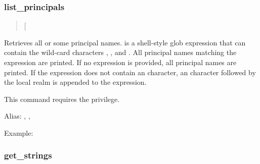 \documentclass[letterpaper,10pt,english]{sphinxmanual}
\begin{document}
\subsubsection{list\_principals}
\label{\detokenize{admin/admin_commands/kadmin_local:get-principal-end}}\label{\detokenize{admin/admin_commands/kadmin_local:id8}}\label{\detokenize{admin/admin_commands/kadmin_local:list-principals}}\begin{quote}

 {[}\sphinxstyleemphasis{expression}{]}
\end{quote}

Retrieves all or some principal names.   is a shell-style
glob expression that can contain the wild-card characters ,
\sphinxcode{*}, and \sphinxcode{{[}{]}}.  All principal names matching the expression are
printed.  If no expression is provided, all principal names are
printed.  If the expression does not contain an  character, an
 character followed by the local realm is appended to the
expression.

This command requires the  privilege.

Alias: , , 

Example:

%
\begin{sphinxVerbatim}[commandchars=\\\{\}]
   
\end{sphinxVerbatim}
\label{\detokenize{admin/admin_commands/kadmin_local:list-principals-end}}

\subsubsection{get\_strings}
\label{\detokenize{admin/admin_commands/kadmin_local:id9}}\label{\detokenize{admin/admin_commands/kadmin_local:get-strings}}\label{\detokenize{admin/admin_commands/kadmin_local:list-principals-end}}\begin{quote}

 
\end{quote}
\end{document}
